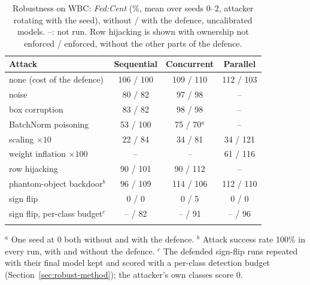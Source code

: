 \documentclass[pdflatex,sn-mathphys-num]{sn-jnl}
\newcommand{\fedcent}{\textit{Fed:Cent}}
\begin{document}
\begin{table}[t]
\caption{Robustness on WBC: \fedcent{} (\%, mean over seeds 0--2, attacker rotating with the seed), without / with the defence, uncalibrated models. --: not run. Row hijacking is shown with ownership not enforced / enforced, without the other parts of the defence.}\label{tab:robust}
\footnotesize
\begin{tabular*}{\textwidth}{@{\extracolsep\fill}lccc}
\toprule
Attack & Sequential & Concurrent & Parallel \\
\midrule
none (cost of the defence) & 106 / 100 & 109 / 110 & 112 / 103 \\
noise & 80 / 82 & 97 / 98 & -- \\
box corruption & 83 / 82 & 98 / 98 & -- \\
BatchNorm poisoning & 53 / 100 & 75 / 70$^{a}$ & -- \\
scaling $\times10$ & 22 / 84 & 34 / 81 & 34 / 121 \\
weight inflation $\times100$ & -- & -- & 61 / 116 \\
row hijacking & 90 / 101 & 90 / 112 & -- \\
phantom-object backdoor$^{b}$ & 96 / 109 & 114 / 106 & 112 / 110 \\
sign flip & 0 / 0 & 0 / 5 & 0 / 0 \\
sign flip, per-class budget$^{c}$ & -- / 82 & -- / 91 & -- / 96 \\
\botrule
\end{tabular*}
\footnotesize{$^{a}$ One seed at 0 both without and with the defence. $^{b}$ Attack success rate 100\% in every run, with and without the defence. $^{c}$ The defended sign-flip runs repeated with their final model kept and scored with a per-class detection budget (Section~\ref{sec:robust-method}); the attacker's own classes score 0.}
\end{table}
\end{document}
